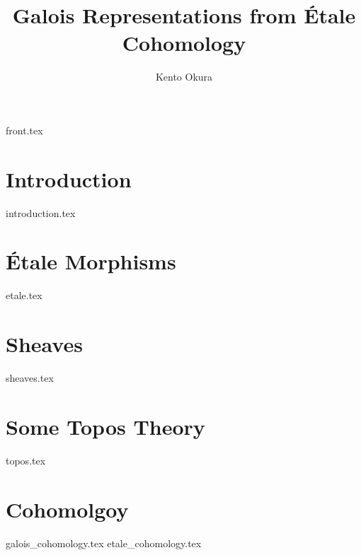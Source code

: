 \documentclass[11pt, openany]{memoir}
\title{Galois Representations from \'Etale Cohomology}
\author{Kento Okura}
\begin{document}
\frontmatter
{front.tex}

\mainmatter

\chapter{Introduction}
{introduction.tex}

\chapter{\'Etale Morphisms}
{etale.tex}

\chapter{Sheaves}
{sheaves.tex}

\chapter{Some Topos Theory}
{topos.tex}

\chapter{Cohomolgoy}
{galois_cohomology.tex}
{etale_cohomology.tex}



\end{document}
